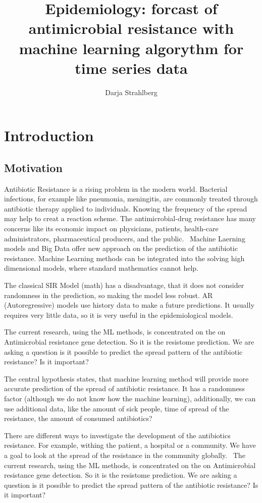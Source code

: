 \documentclass[12pt]{article}
\title{ Epidemiology: forcast of antimicrobial resistance with machine learning algorythm for time series data}
\author{Darja Strahlberg}
\begin{document}
\maketitle

\section{Introduction}
\subsection{Motivation}
Antibiotic Resistance is a rising problem in the modern world. Bacterial infections, for example like pneumonia, meningitis,  are commonly treated through antibiotic therapy applied to individuals. Knowing the frequency of the spread may help to creat a reaction scheme. The antimicrobial-drug resistance has many concerns like its economic impact on physicians, patients, health-care administrators, pharmaceutical producers, and the public.~\cite{JohnE.McGowan.2001}
Machine Laerning models and Big Data offer new approach on the prediction of the antibiotic resistance. Machine Learning methods can be integrated into the solving high dimensional models, where standard mathematics cannot help. 

The classical SIR Model (math) has a disadvantage, that it does not consider randomness in the prediction, so making the model less robust. AR (Autoregressive) models use history data to make a future predictions. It usually requires very little data, so it is very useful in the epidemiological models.

The current research, using the ML methods, is concentrated on the on Antimicrobial resistance gene detection. So it is the resistome prediction. We are asking a question is it possible to predict the spread pattern of the antibiotic resistance? Is it important?

The central hypothesis states, that machine learning method will provide more accurate prediction of the spread of antibiotic resistance. It has a randomness factor (although we do not know how the machine learning), additionally, we can use additional data, like the amount of sick people, time of spread of the resistance, the amount of consumed antibiotics?

There are different ways to investigate the development of the antibiotics resistance. For example, withing the patient, a hospital or a community. We have a goal to look at the spread of the resistance in the community globally.~\cite{Austin.} The current research, using the ML methods, is concentrated on the on Antimicrobial resistance gene detection. So it is the resistome prediction. We are asking a question is it possible to predict the spread pattern of the antibiotic resistance? Is it important?
\end{document}
